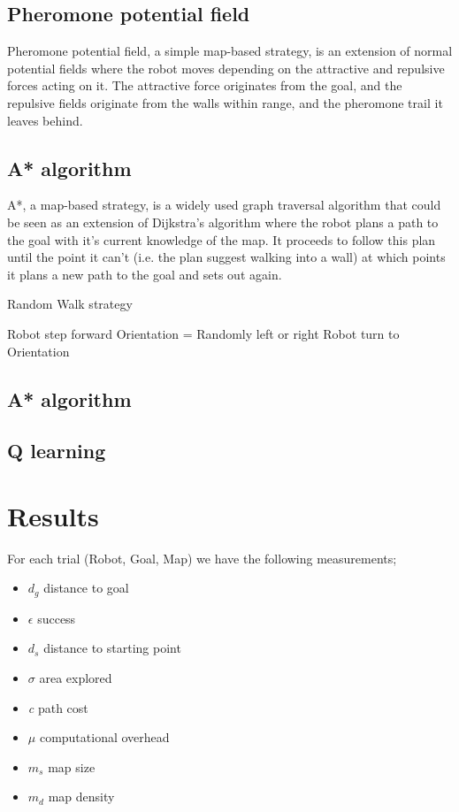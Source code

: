 \documentclass[letterpaper, 10 pt, conference]{ieeeconf}  %
\begin{document}
\subsection{Pheromone potential field}
Pheromone potential field, a simple map-based strategy, is an extension of normal potential fields where the robot moves depending on the attractive and repulsive forces acting on it. The attractive force originates from the goal, and the repulsive fields originate from the walls within range, and the pheromone trail it leaves behind.

\subsection{A* algorithm}
A*, a map-based strategy, is a widely used graph traversal algorithm that could be seen as an extension of Dijkstra's algorithm where the robot plans a path to the goal with it's current knowledge of the map. It proceeds to follow this plan until the point it can't (i.e. the plan suggest walking into a wall) at which points it plans a new path to the goal and sets out again.

\begin{algorithm}
	\caption{Random Walk strategy}
	\begin{algorithmic} 
		\STATE Robot step forward
		\ELSE 
		\STATE Orientation = Randomly left or right
		\STATE Robot turn to Orientation
		\ENDIF
		\ENDWHILE
	\end{algorithmic}
\end{algorithm}
\subsection{A* algorithm}
\subsection{Q learning}


\section{Results}

For each trial (Robot, Goal, Map) we have the following measurements;
\begin{itemize}
	\item \textit{$d_{g}$} distance to goal
	\item \textit{$\epsilon$} success 
	\item \textit{$d_{s}$} distance to starting point
	\item $\sigma$ area explored
	\item \textit{c} path cost
	\item $\mu$ computational overhead
	\item \textit{$m_{s}$} map size
	\item \textit{$m_{d}$} map density
\end{itemize}
\end{document}
